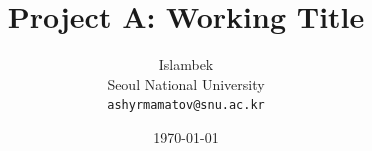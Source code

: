 \documentclass{article}
\title{Project A: Working Title}
\author{Islambek \\ Seoul National University \\ \texttt{ashyrmamatov@snu.ac.kr}}
\date{\today}
\begin{document}
\maketitle

\begin{abstract}

\end{abstract}








\end{document}
